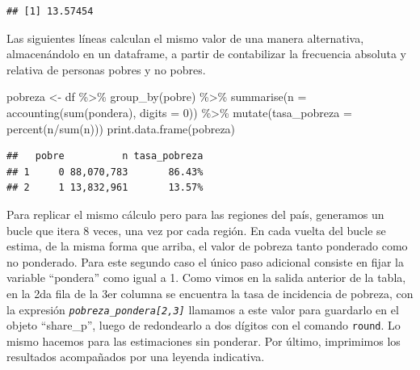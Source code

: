\documentclass[
]{book}
\newenvironment{Shaded}{\begin{snugshade}}{\end{snugshade}}
\newcommand{\AttributeTok}[1]{\textcolor[rgb]{0.77,0.63,0.00}{#1}}
\newcommand{\DecValTok}[1]{\textcolor[rgb]{0.00,0.00,0.81}{#1}}
\newcommand{\FunctionTok}[1]{\textcolor[rgb]{0.00,0.00,0.00}{#1}}
\newcommand{\NormalTok}[1]{#1}
\newcommand{\OtherTok}[1]{\textcolor[rgb]{0.56,0.35,0.01}{#1}}
\newcommand{\SpecialCharTok}[1]{\textcolor[rgb]{0.00,0.00,0.00}{#1}}
\begin{document}
\begin{verbatim}
## [1] 13.57454
\end{verbatim}

Las siguientes líneas calculan el mismo valor de una manera alternativa, almacenándolo en un dataframe, a partir de contabilizar la frecuencia absoluta y relativa de personas pobres y no pobres.

\begin{Shaded}
\begin{Highlighting}[]
\NormalTok{pobreza }\OtherTok{\textless{}{-}}\NormalTok{ df }\SpecialCharTok{\%\textgreater{}\%} \FunctionTok{group\_by}\NormalTok{(pobre) }\SpecialCharTok{\%\textgreater{}\%} \FunctionTok{summarise}\NormalTok{(}\AttributeTok{n =} \FunctionTok{accounting}\NormalTok{(}\FunctionTok{sum}\NormalTok{(pondera), }\AttributeTok{digits =} \DecValTok{0}\NormalTok{)) }\SpecialCharTok{\%\textgreater{}\%} 
                                   \FunctionTok{mutate}\NormalTok{(}\AttributeTok{tasa\_pobreza =} \FunctionTok{percent}\NormalTok{(n}\SpecialCharTok{/}\FunctionTok{sum}\NormalTok{(n))) }
\FunctionTok{print.data.frame}\NormalTok{(pobreza)}
\end{Highlighting}
\end{Shaded}

\begin{verbatim}
##   pobre          n tasa_pobreza
## 1     0 88,070,783       86.43%
## 2     1 13,832,961       13.57%
\end{verbatim}

Para replicar el mismo cálculo pero para las regiones del país, generamos un bucle que itera 8 veces, una vez por cada región. En cada vuelta del bucle se estima, de la misma forma que arriba, el valor de pobreza tanto ponderado como no ponderado. Para este segundo caso el único paso adicional consiste en fijar la variable ``pondera'' como igual a 1. Como vimos en la salida anterior de la tabla, en la 2da fila de la 3er columna se encuentra la tasa de incidencia de pobreza, con la expresión \emph{\texttt{pobreza\_pondera{[}2,3{]}}} llamamos a este valor para guardarlo en el objeto ``share\_p'', luego de redondearlo a dos dígitos con el comando \texttt{round}. Lo mismo hacemos para las estimaciones sin ponderar. Por último, imprimimos los resultados acompañados por una leyenda indicativa.
\end{document}
